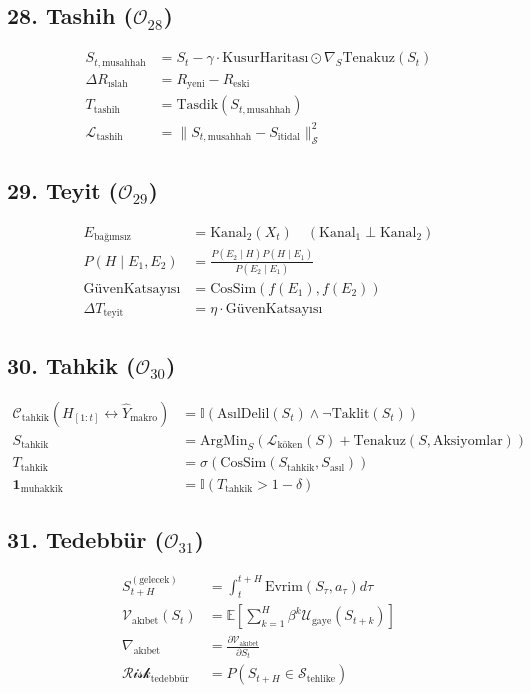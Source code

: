 \documentclass[11pt, a4paper]{article}
\begin{document}
\subsection{28. Tashih ($\mathcal{O}_{28}$)}
\begin{align}
S_{t, \text{musahhah}} &= S_t - \gamma \cdot \text{KusurHaritası} \odot \nabla_{S} \text{Tenakuz}(S_t) \\
\Delta R_{\text{ıslah}} &= R_{\text{yeni}} - R_{\text{eski}} \\
T_{\text{tashih}} &= \text{Tasdik}(S_{t, \text{musahhah}}) \\
\mathcal{L}_{\text{tashih}} &= \| S_{t, \text{musahhah}} - S_{\text{itidal}} \|_{\mathcal{S}}^2
\end{align}

\subsection{29. Teyit ($\mathcal{O}_{29}$)}
\begin{align}
E_{\text{bağımsız}} &= \text{Kanal}_2(X_t) \quad (\text{Kanal}_1 \perp \text{Kanal}_2) \\
P(H \mid E_1, E_2) &= \frac{P(E_2 \mid H) P(H \mid E_1)}{P(E_2 \mid E_1)} \\
\text{GüvenKatsayısı} &= \text{CosSim}(f(E_1), f(E_2)) \\
\Delta T_{\text{teyit}} &= \eta \cdot \text{GüvenKatsayısı}
\end{align}

\subsection{30. Tahkik ($\mathcal{O}_{30}$)}
\begin{align}
\mathcal{C}_{\text{tahkik}}(H_{[1:t]} \leftrightarrow \hat{Y}_{\text{makro}}) &= \mathbb{I}\left( \text{AsılDelil}(S_t) \land \neg \text{Taklit}(S_t) \right) \\
S_{\text{tahkik}} &= \text{ArgMin}_{S} \left( \mathcal{L}_{\text{köken}}(S) + \text{Tenakuz}(S, \text{Aksiyomlar}) \right) \\
T_{\text{tahkik}} &= \sigma\left( \text{CosSim}(S_{\text{tahkik}}, S_{\text{asıl}}) \right) \\
\mathbf{1}_{\text{muhakkik}} &= \mathbb{I}(T_{\text{tahkik}} > 1 - \delta)
\end{align}

\subsection{31. Tedebbür ($\mathcal{O}_{31}$)}
\begin{align}
S_{t+H}^{(\text{gelecek})} &= \int_t^{t+H} \text{Evrim}(S_\tau, a_\tau) d\tau \\
\mathcal{V}_{\text{akıbet}}(S_t) &= \mathbb{E}\left[ \sum_{k=1}^H \beta^k \mathcal{U}_{\text{gaye}}(S_{t+k}) \right] \\
\nabla_{\text{akıbet}} &= \frac{\partial \mathcal{V}_{\text{akıbet}}}{\partial S_t} \\
\mathcal{Risk}_{\text{tedebbür}} &= P(S_{t+H} \in \mathcal{S}_{\text{tehlike}})
\end{align}
\end{document}
